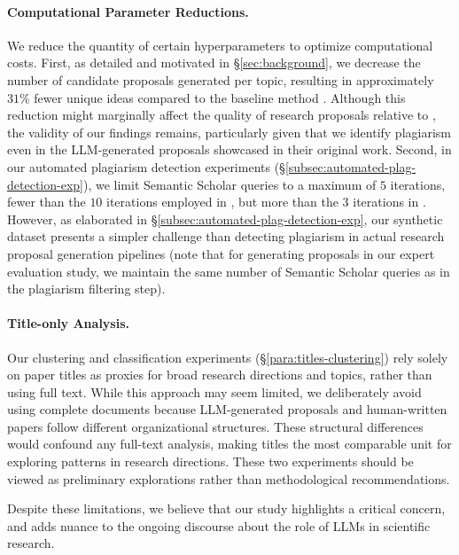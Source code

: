 \paragraph{Computational Parameter Reductions.} 
We reduce the quantity of certain hyperparameters to optimize computational costs. 
First, as detailed and motivated in \S\ref{sec:background}, 
we decrease the number of candidate proposals generated per topic, 
resulting in approximately $31\%$ fewer unique ideas compared to the baseline method \citep{si2024can}. 
Although this reduction might marginally affect the quality of research proposals relative to \citet{si2024can}, 
the validity of our findings remains, 
particularly given that we identify plagiarism even in the LLM-generated proposals showcased in their original work. 
Second, in our automated plagiarism detection experiments (\S\ref{subsec:automated-plag-detection-exp}), 
we limit Semantic Scholar queries to a maximum of $5$ iterations, 
fewer than the $10$ iterations employed in \citet{si2024can,lu2024ai}, but more than the $3$ iterations in \citet{li2024chain}. 
However, as elaborated in \S\ref{subsec:automated-plag-detection-exp}, 
our synthetic dataset presents a simpler challenge than detecting plagiarism in actual research proposal generation pipelines
(note that for generating proposals in our expert evaluation study, we maintain the same number of Semantic Scholar queries as \citet{si2024can} in the plagiarism filtering step).

\paragraph{Title-only Analysis.} 
Our clustering 
and classification experiments (\S\ref{para:titles-clustering}) 
rely solely on paper titles as proxies for broad research directions and topics, 
rather than using full text.
While this approach may seem limited, 
we deliberately avoid using complete documents because LLM-generated proposals 
and human-written papers follow different organizational structures. 
These structural differences would confound any full-text analysis, 
making titles the most comparable unit for exploring patterns in research directions. 
These two experiments should be viewed as preliminary explorations rather than methodological recommendations.

Despite these limitations, 
we believe that our study highlights a critical concern, 
and adds nuance to the 
ongoing discourse about the role of LLMs in scientific research.
